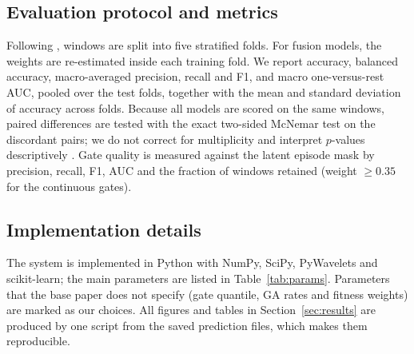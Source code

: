 \documentclass[10pt,twoside]{article}
\begin{document}
\subsection{Evaluation protocol and metrics}
Following \cite{FarhadiSedehi2024a}, windows are split into five stratified folds. For fusion models, the weights are re-estimated inside each training fold. We report accuracy, balanced accuracy, macro-averaged precision, recall and F1, and macro one-versus-rest AUC, pooled over the test folds, together with the mean and standard deviation of accuracy across folds. Because all models are scored on the same windows, paired differences are tested with the exact two-sided McNemar test \cite{McNemar1947} on the discordant pairs; we do not correct for multiplicity and interpret $p$-values descriptively \cite{Demsar2006}. Gate quality is measured against the latent episode mask by precision, recall, F1, AUC and the fraction of windows retained (weight $\ge0.35$ for the continuous gates).

\subsection{Implementation details}
The system is implemented in Python with NumPy, SciPy, PyWavelets and scikit-learn; the main parameters are listed in Table~\ref{tab:params}. Parameters that the base paper does not specify (gate quantile, GA rates and fitness weights) are marked as our choices. All figures and tables in Section~\ref{sec:results} are produced by one script from the saved prediction files, which makes them reproducible.
\end{document}
